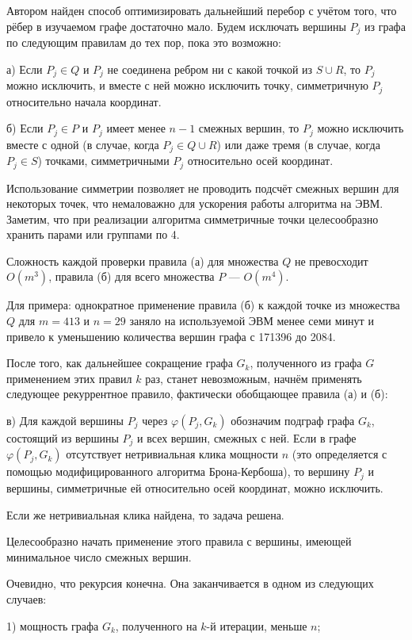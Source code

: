 \documentclass{article}
\begin{document}
Автором найден способ оптимизировать дальнейший перебор с учётом того, что рёбер в изучаемом графе достаточно мало.
Будем исключать вершины $P_j$ из графа по следующим правилам до тех пор, пока это возможно:

а) Если $P_j \in Q$ и $P_j$ не соединена ребром ни с какой точкой из $S \cup R$, то $P_j$ можно исключить, и вместе с ней можно исключить точку, симметричную $P_j$ относительно начала координат.

б) Если $P_j \in P$ и $P_j$ имеет менее $n-1$ смежных вершин, то $P_j$ можно исключить вместе с одной (в случае, когда $P_j \in Q \cup R$) или даже тремя (в случае, когда $P_j \in S$) точками, симметричными $P_j$ относительно осей координат.

Использование симметрии позволяет не проводить подсчёт смежных вершин для некоторых точек, что немаловажно для ускорения работы алгоритма на ЭВМ.
Заметим, что при реализации алгоритма симметричные точки целесообразно хранить парами или группами по 4.

Сложность каждой проверки правила (а) для множества $Q$ не превосходит $O(m^3)$, правила (б) для всего множества $P$ --- $O(m^4)$.

Для примера: однократное применение правила (б) к каждой точке из множества $Q$ для $m=413$ и $n=29$ заняло на используемой ЭВМ менее семи минут и привело к уменьшению количества вершин графа с 171396 до 2084.

После того, как дальнейшее сокращение графа $G_k$, полученного из графа $G$ применением этих правил $k$ раз, станет невозможным, начнём применять следующее рекуррентное правило, фактически обобщающее правила (а) и (б):

в)
Для каждой вершины $P_j$ через $\varphi(P_j,G_k)$ обозначим подграф графа $G_k$, состоящий из вершины $P_j$ и всех вершин, смежных с ней.
Если в графе $\varphi(P_j,G_k)$ отсутствует нетривиальная клика мощности $n$ (это определяется с помощью модифицированного алгоритма Брона-Кербоша), то вершину $P_j$ и вершины, симметричные ей относительно осей координат, можно исключить.

Если же нетривиальная клика найдена, то задача решена.

Целесообразно начать применение этого правила с вершины, имеющей минимальное число смежных вершин.

Очевидно, что рекурсия конечна.
Она заканчивается в одном из следующих случаев:

1) мощность графа $G_k$, полученного на $k$-й итерации, меньше $n$;
\end{document}
